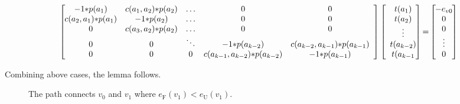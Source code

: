\documentclass[12pt,journal,onecolumn,draftcls]{IEEEtran}
\begin{document}
\begin{IEEEproof}
\begin{itemize}
\begin{figure}
\begin{equation}
\label{eqn_violation_proof}
\left[\hspace{-2mm}
\begin{array}{c c c c c}
-1{*}p(a_1)          &   c(a_1,a_2){*}p(a_2)  &          \ldots    & 0      &   0\\
c(a_2,a_1){*}p(a_1)  &       -1{*}p(a_2)      &    \ldots    & 0      &    0\\
    0       &   c(a_3,a_2){*}p(a_2)         &    \ldots  & 0      &   0\\
    0       &   0           &         \ddots     &-1{*}p(a_{k{-}2})      &c(a_{k{-}2},a_{k{-}1}){*}p(a_{k{-}1})\\
    0       &   0           &            0    & c(a_{k{-}1},a_{k{-}2}){*}p(a_{k{-}2})     & -1{*}p(a_{k{-}1})\\
\end{array}
\right]
\left[
\begin{array}{c}
t(a_1)\\
t(a_2)\\
\vdots\\
t(a_{k{-}2})\\
t(a_{k{-}1}\\
\end{array}
\hspace{-2mm}
\right]
{=}
\left[
\hspace{-2mm}
\begin{array}{c}
-e_{v0}\\
0\\
0\\
\vdots\\
0\\
\end{array}
\hspace{-2mm}
\right]
\end{equation}
\end{figure}

\end{itemize}

Combining above cases, the lemma follows.
\end{IEEEproof}

\begin{figure}[htb]
\caption{The path connects $v_0$ and $v_1$ where $e_\text{F}(v_1){<}e_\text{U}(v_1)$.}
\label{fig_path}
\end{figure}
\end{document}
